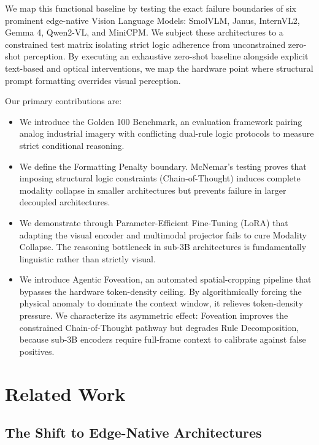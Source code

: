 \documentclass{article}
\begin{document}
We map this functional baseline by testing the exact failure boundaries of six prominent edge-native Vision Language Models: SmolVLM, Janus, InternVL2, Gemma 4, Qwen2-VL, and MiniCPM. We subject these architectures to a constrained test matrix isolating strict logic adherence from unconstrained zero-shot perception. By executing an exhaustive zero-shot baseline alongside explicit text-based and optical interventions, we map the hardware point where structural prompt formatting overrides visual perception.

Our primary contributions are:
\begin{itemize}
    \item We introduce the Golden 100 Benchmark, an evaluation framework pairing analog industrial imagery with conflicting dual-rule logic protocols to measure strict conditional reasoning.
    \item We define the Formatting Penalty boundary. McNemar's testing proves that imposing structural logic constraints (Chain-of-Thought) induces complete modality collapse in smaller architectures but prevents failure in larger decoupled architectures.
    \item We demonstrate through Parameter-Efficient Fine-Tuning (LoRA) that adapting the visual encoder and multimodal projector fails to cure Modality Collapse. The reasoning bottleneck in sub-3B architectures is fundamentally linguistic rather than strictly visual.
    \item We introduce Agentic Foveation, an automated spatial-cropping pipeline that bypasses the hardware token-density ceiling. By algorithmically forcing the physical anomaly to dominate the context window, it relieves token-density pressure. We characterize its asymmetric effect: Foveation improves the constrained Chain-of-Thought pathway but degrades Rule Decomposition, because sub-3B encoders require full-frame context to calibrate against false positives.
\end{itemize}


\section*{Related Work}


\subsection*{The Shift to Edge-Native Architectures}
\end{document}
